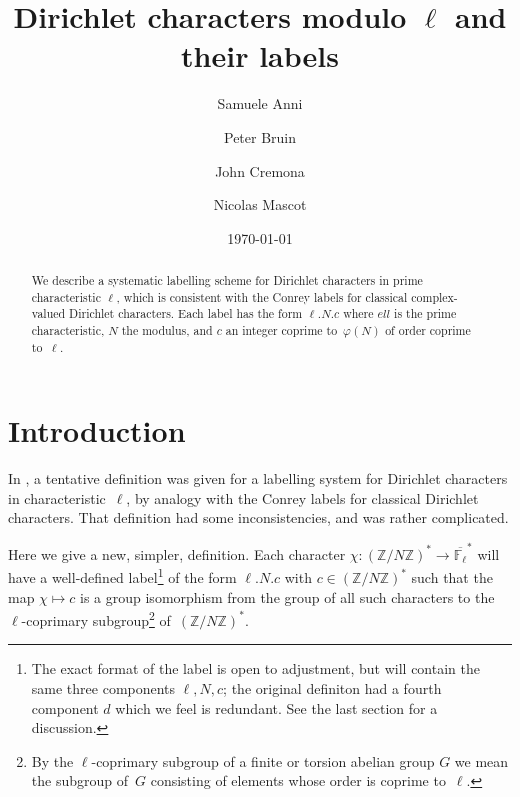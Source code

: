 \documentclass[a4paper, 10pt]{amsart}
\def\Z{{\mathbb Z}}
\def\Flbar{\overline{{\mathbb F}_{\ell}}}
\def\ZNs{(\Z/N\Z)^*}
\newcommand{\DLab}[3]{$#1.#2.#3$}   %
\begin{document}
\title{Dirichlet characters modulo $\ell$ and their labels}

\author{Samuele Anni}
\address{Aix-Marseille Universit\'e, France}
\author{Peter Bruin}
\address{Mathematisch Instituut, University of Leiden, Netherlands}
\author{John Cremona}
\address{Mathematics Institute, University of Warwick, Coventry CV4 7AL, UK}
\author{Nicolas Mascot}
\address{School of Mathematics, Trinity College, Dublin, Republic of Ireland}

\date{\today}

\begin {abstract}
We describe a systematic labelling scheme for Dirichlet characters in
prime characteristic $\ell$, which is consistent with the Conrey
labels for classical complex-valued Dirichlet characters.  Each label
has the form \DLab{\ell}{N}{c} where $ell$ is the prime
characteristic, $N$ the modulus, and $c$ an integer coprime
to~$\varphi(N)$ of order coprime to~$\ell$.
\end {abstract}

\maketitle


\section{Introduction}
In \cite{OldDef}, a tentative definition was given for a labelling
system for Dirichlet characters in characteristic~$\ell$, by analogy
with the Conrey labels for classical Dirichlet characters.  That
definition had some inconsistencies, and was rather complicated.

Here we give a new, simpler, definition.  Each character
$\chi:\ZNs\to\Flbar^*$ will have a well-defined label\footnote{The
  exact format of the label is open to adjustment, but will contain
  the same three components $\ell,N,c$; the original definiton had a
  fourth component $d$ which we feel is redundant.  See the last
  section for a discussion.} of the form \DLab{\ell}{N}{c} with
$c\in\ZNs$ such that the map $\chi\mapsto c$ is a group isomorphism
from the group of all such characters to the $\ell$-coprimary
subgroup\footnote{By the $\ell$-coprimary subgroup of a finite or
  torsion abelian group $G$ we mean the subgroup of~$G$ consisting of
  elements whose order is coprime to~$\ell$.} of~$\ZNs$.
\end{document}
